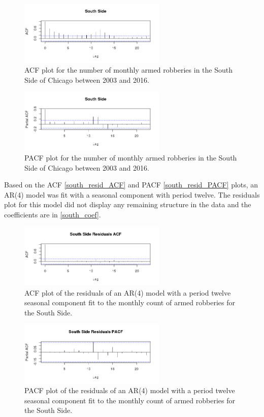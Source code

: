 \documentclass{article} %
\begin{document}
\break 
\begin{multicols}{2}
\begin{figure}[H]
\includegraphics[width=70mm]{Plots/south_ACF.png}
\caption{ACF plot for the number of monthly armed robberies in the South Side of Chicago between 2003 and 2016.}
\end{figure}

\begin{figure}[H]
\includegraphics[width=70mm]{Plots/south_PACF.png}
\caption{PACF plot for the number of monthly armed robberies in the South Side of Chicago between 2003 and 2016.}
\end{figure}
\end{multicols}

\noindent Based on the ACF \autoref{south_resid_ACF} and PACF \autoref{south_resid_PACF} plots, an AR(4) model was fit with a seasonal component with period twelve. The residuals plot for this model did not display any remaining structure in the data and the coefficients are in \autoref{south_coef}. 

\begin{multicols}{2}
\begin{figure}[H]
\includegraphics[width=70mm]{Plots/south_resid_ACF.png}
\caption{ACF plot of the residuals of an AR(4) model with a period twelve seasonal component fit to the monthly count of armed robberies for the South Side.}
\label{south_resid_ACF}
\end{figure}

\begin{figure}[H]
\includegraphics[width=70mm]{Plots/south_resid_PACF.png}
\caption{PACF plot of the residuals of an AR(4) model with a period twelve seasonal component fit to the monthly count of armed robberies for the South Side.}
\end{figure}
\label{south_resid_PACF}
\end{multicols}
\end{document}
